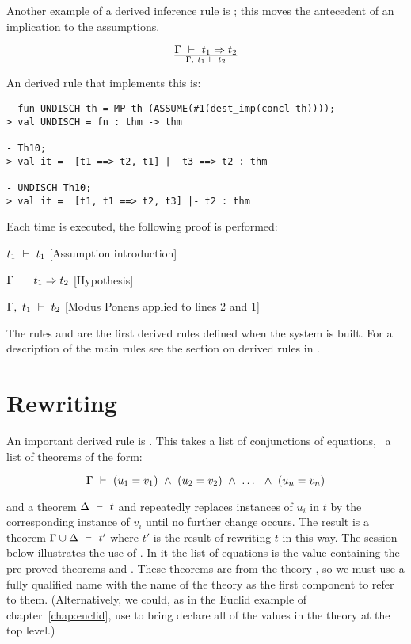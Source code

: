     Another example of a derived inference rule is ; this
    moves the antecedent of an implication to the assumptions.

\[ \Gamma\turn t_1\imp t_2 \over\Gamma,\ t_1\turn t_2 \]

\noindent An \ML{} derived rule that implements this is:


\begin{session}\begin{verbatim}
- fun UNDISCH th = MP th (ASSUME(#1(dest_imp(concl th))));
> val UNDISCH = fn : thm -> thm

- Th10;
> val it =  [t1 ==> t2, t1] |- t3 ==> t2 : thm

- UNDISCH Th10;
> val it =  [t1, t1 ==> t2, t3] |- t2 : thm
\end{verbatim}\end{session}

\noindent Each time  is executed,
the following proof is performed:

\begin{proofenumerate}
\item $ t_1\ \vdash\  t_1$ \hfill [Assumption introduction]
\item $ \Gamma\ \vdash\  t_1\Rightarrow t_2$ \hfill [Hypothesis]
\item $ \Gamma,\ t_1\ \vdash\  t_2$ \hfill [Modus Ponens applied to lines 2 and 1]
\end{proofenumerate}

The rules  and  are the first derived rules
defined when the \HOL{} system is built. For a description of the main
rules see the section on derived rules in \DESCRIPTION.

\section{Rewriting}

An important derived rule is .  This takes a list of
conjunctions of equations, \ie\ a list of theorems of the form:

\[ \Gamma\ \vdash\  (u_1 = v_1) \ \wedge\  (u_2 = v_2) \ \wedge\  \ldots\ \ \wedge\  (u_n  = v_n)\]

\noindent  and a theorem
$\Delta\ \vdash\  t$ and repeatedly replaces instances of $u_i$ in $t$ by
the corresponding instance of $v_i$ until no further change occurs.
The result is a theorem $\Gamma\cup\Delta\ \vdash\  t'$ where $t'$ is the
result of rewriting $t$ in this way.  The session below illustrates
the use of .  In it the list of equations is the
value  containing the pre-proved theorems
 and .  These theorems are from the
theory , so we must use a fully qualified name with the
name of the theory as the first component to refer to them.
(Alternatively, we could, as in the Euclid example of
chapter~\ref{chap:euclid}, use  to bring declare all of the
values in the theory at the top level.)

